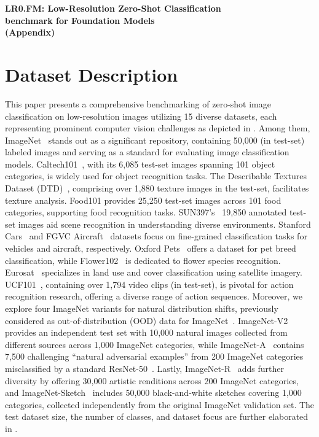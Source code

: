 \begin{center}
    \Large{\textbf{LR0.FM: Low-Resolution Zero-Shot Classification\\ benchmark for Foundation Models\\
(Appendix)}}
\end{center}

\section{Dataset Description}
This paper presents a comprehensive benchmarking of zero-shot image classification on low-resolution images utilizing 15 diverse datasets, each representing prominent computer vision challenges as depicted in . Among them, ImageNet~\cite{deng2009imagenet} stands out as a significant repository, containing 50,000 (in test-set) labeled images and serving as a standard for evaluating image classification models. 
Caltech101~\cite{griffin2007caltech}, with its 6,085 test-set images spanning 101 object categories, is widely used for object recognition tasks.
The Describable Textures Dataset (DTD)~\cite{cimpoi2014describing}, comprising over 1,880 texture images in the test-set, facilitates texture analysis.
Food101 provides 25,250 test-set images across 101 food categories, supporting food recognition tasks. SUN397’s~\cite{zhou2014learning} 19,850 annotated test-set images aid scene recognition in understanding diverse environments. Stanford Cars~\cite{kramberger2020lsun} and FGVC Aircraft~\cite{maji2013fine} datasets focus on fine-grained classification tasks for vehicles and aircraft, respectively. Oxford Pets~\cite{parkhi2012cats} offers a dataset for pet breed classification, while Flower102~\cite{liu2016flower} is dedicated to flower species recognition. Eurosat~\cite{helber2019eurosat} specializes in land use and cover classification using satellite imagery. UCF101~\cite{soomro2012ucf101}, containing over 1,794 video clips (in test-set), is pivotal for action recognition research, offering a diverse range of action sequences.  Moreover, we explore four ImageNet variants for natural distribution shifts, previously considered as out-of-distribution (OOD) data for ImageNet~\cite{radford2021learning, shu2022test}. ImageNet-V2~\cite{recht2019imagenet} provides an independent test set with 10,000 natural images collected from different sources across 1,000 ImageNet categories, while ImageNet-A~\cite{hendrycks2021nae} contains 7,500 challenging ``natural adversarial examples'' from 200 ImageNet categories misclassified by a standard ResNet-50~\cite{he2016deep}. Lastly, ImageNet-R~\cite{hendrycks2021many} adds further diversity by offering 30,000 artistic renditions across 200 ImageNet categories, and ImageNet-Sketch~\cite{wang2019learning} includes 50,000 black-and-white sketches covering 1,000 categories, collected independently from the original ImageNet validation set. The test dataset size, the number of classes, and dataset focus are further elaborated in .


